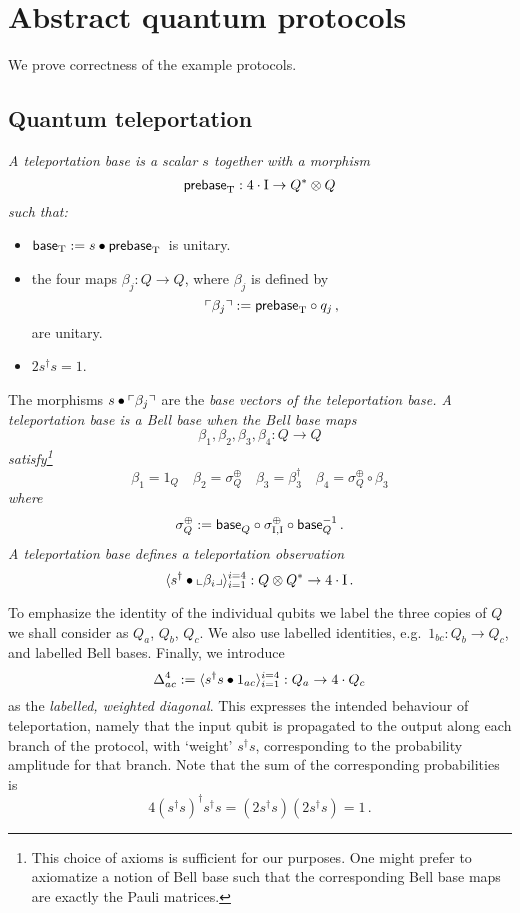 \documentclass[10pt]{article}
\begin{document}
\section{Abstract quantum protocols}

\noindent We prove correctness of the example protocols.

\subsection{Quantum teleportation} 

\begin{definition}\em
A \em teleportation base \em is a scalar $s$ together with a  
morphism 
\[
{\sf prebase}_{\rm T} : 4\cdot{\rm I}\to Q^*\otimes Q
\]
such that:
\begin{itemize}
\item ${\sf base}_{\rm T} := s \bullet {\sf prebase}_{\rm T}\,$ is unitary.
\item the four maps $\beta_j:Q\to Q$, where $\beta_j$ is defined by 
\[
\ulcorner\beta_j\urcorner:={\sf prebase}_{\rm
T}\circ q_j\,,
\]
are unitary. 
\item $2 s^{\dagger} s = 1$.
\end{itemize}
The morphisms $s \bullet \ulcorner\beta_j\urcorner$ are the \em base 
vectors \em of the teleportation base.   A teleportation base is a  
\em Bell base \em when
the \em 
Bell base  maps \em 
\[
\beta_1,\beta_2,\beta_3,\beta_4:Q\to Q
\]
satisfy\footnote{This choice of axioms is sufficient for our purposes.  One might prefer to axiomatize a notion of Bell base such that the corresponding Bell base maps are exactly the Pauli matrices.}
\[
\beta_1=1_Q\quad \beta_2=\sigma_{Q}^{\oplus}\quad \beta_3=\beta^\dagger_3\quad
\beta_4=\sigma_{Q}^{\oplus}\circ\beta_3
\]
where 
\[
\sigma_{Q}^{\oplus}:={\sf base}_Q^{}\circ\sigma^\oplus_{{\rm I},{\rm I}}\circ{\sf
base}_Q^{-1}\,.
\]
A teleportation base defines a \em teleportation observation \em
\[
\langle s^{\dagger} \bullet 
\llcorner
\beta_i\lrcorner\rangle_{i=1}^{i=4}:Q\otimes Q^*\to 4\cdot{\rm
I}\,.
\]
\end{definition}

To emphasize the
identity of the individual qubits we label the three copies of $Q$ we
shall consider as $Q_a$, $Q_b$, $Q_c$. We also use labelled
identities,
e.g.~${1_{bc} : Q_b \rightarrow Q_c}$, and labelled Bell bases.
Finally, we introduce 
\[
\Delta_{ac}^4:=\langle s^{\dagger}s \bullet 1_{ac}\rangle_{i=1}^{i=4}:
Q_a\to 4\cdot Q_c
\]
as the \emph{labelled,
weighted diagonal}. This expresses the intended behaviour of teleportation, namely that the
input qubit is propagated to the output along each branch of the
protocol, with `weight' $s^{\dagger}s$,  corresponding to the probability
amplitude for that branch. Note that the sum of the corresponding
probabilities is 
\[
4(s^{\dagger}s)^{\dagger}s^{\dagger}s = (2s^{\dagger} s)(2 s^{\dagger} s) =
1\,.
\]
\end{document}
